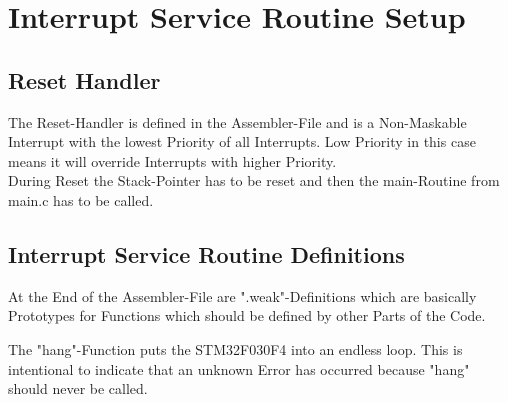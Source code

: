 \section{Interrupt Service Routine Setup}

\subsection{Reset Handler}

The Reset-Handler is defined in the Assembler-File and is a Non-Maskable Interrupt with the lowest Priority of all Interrupts.
Low Priority in this case means it will override Interrupts with higher Priority.\\
During Reset the Stack-Pointer has to be reset and then the main-Routine from main.c has to be called.



\subsection{Interrupt Service Routine Definitions}

At the End of the Assembler-File are ".weak"-Definitions which are basically Prototypes for Functions which should be defined by other Parts of the Code.



The "hang"-Function puts the STM32F030F4 into an endless loop. This is intentional to indicate that an unknown Error has occurred because "hang" should never be called.


